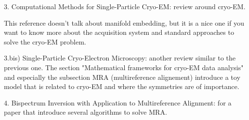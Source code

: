 3. Computational Methods for Single-Particle Cryo-EM: 
review around cryo-EM. 

This reference doesn't talk about manifold embedding, but it is a nice one if you want to know more about 
the acquisition system and standard approaches to solve the cryo-EM problem.


3.bis) Single-Particle Cryo-Electron Microscopy: 
another review similar to the previous one. The section "Mathematical frameworks for cryo-EM data analysis" 
and especially the subsection MRA (multireference alignement) introduce 
a toy model that is related to cryo-EM and where the symmetries are of importance. 

4. Bispectrum Inversion with Application to Multireference Alignment: 
for a paper that introduce several algorithms to solve MRA.